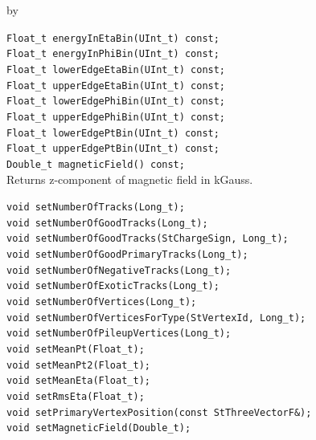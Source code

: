 \documentclass[twoside]{article}
\newcommand{\entrylabel}[1]{\mbox{\textbf{{#1}}}\hfil}%
\newenvironment{entry}
{\begin{list}{}%
    {\renewcommand{\makelabel}{\entrylabel}%
     \setlength{\labelwidth}{90pt}%
     \setlength{\leftmargin}{\labelwidth}
     \advance\leftmargin by \labelsep%
      }%
    }%
  {\end{list}}
\newcommand{\Entrylabel}[1]%
{\raisebox{0pt}[1ex][0pt]{\makebox[\labelwidth][l]%
    {\parbox[t]{\labelwidth}{\hspace{0pt}\textbf{{#1}}}}}}
\newenvironment{Entry}%
{\renewcommand{\entrylabel}{\Entrylabel}\begin{entry}}%
  {\end{entry}}
\begin{document}
\begin{Entry}
    \verb+Float_t energyInEtaBin(UInt_t) const;+\\
    \verb+Float_t energyInPhiBin(UInt_t) const;+\\
    \verb+Float_t lowerEdgeEtaBin(UInt_t) const;+\\
    \verb+Float_t upperEdgeEtaBin(UInt_t) const;+\\
    \verb+Float_t lowerEdgePhiBin(UInt_t) const;+\\
    \verb+Float_t upperEdgePhiBin(UInt_t) const;+\\
    \verb+Float_t lowerEdgePtBin(UInt_t) const;+\\
    \verb+Float_t upperEdgePtBin(UInt_t) const;+\\

    \verb+Double_t magneticField() const;+\\
    Returns z-component of magnetic field in kGauss.
    
    \verb+void setNumberOfTracks(Long_t);+\\
    \verb+void setNumberOfGoodTracks(Long_t);+\\
    \verb+void setNumberOfGoodTracks(StChargeSign, Long_t);+\\
    \verb+void setNumberOfGoodPrimaryTracks(Long_t);+\\
    \verb+void setNumberOfNegativeTracks(Long_t);+\\
    \verb+void setNumberOfExoticTracks(Long_t);+\\
    \verb+void setNumberOfVertices(Long_t);+\\
    \verb+void setNumberOfVerticesForType(StVertexId, Long_t);+\\
    \verb+void setNumberOfPileupVertices(Long_t);+\\
    \verb+void setMeanPt(Float_t);+\\
    \verb+void setMeanPt2(Float_t);+\\
    \verb+void setMeanEta(Float_t);+\\
    \verb+void setRmsEta(Float_t);+\\
    \verb+void setPrimaryVertexPosition(const StThreeVectorF&);+\\
    \verb+void setMagneticField(Double_t);+\\
\end{Entry}
\clearpage
\end{document}
